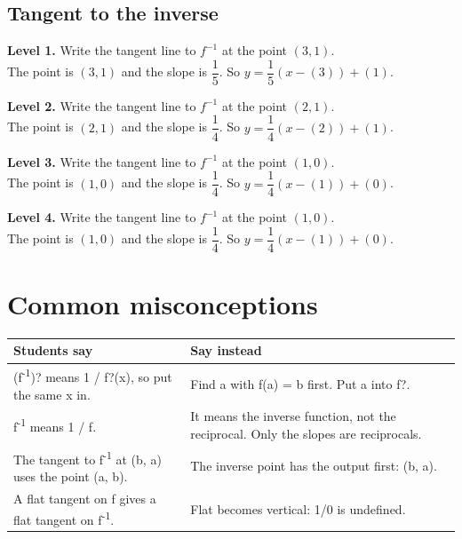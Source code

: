 \documentclass[11pt]{article}
\begin{document}
\subsection*{Tangent to the inverse}
\noindent\textbf{Level 1.} Write the tangent line to $f^{-1}$ at the point $(3,1)$.\\  \quad The point is $(3,1)$ and the slope is $\dfrac1{5}$. So $y=\dfrac1{5}(x-(3))+(1)$.\par\medskip
\noindent\textbf{Level 2.} Write the tangent line to $f^{-1}$ at the point $(2,1)$.\\  \quad The point is $(2,1)$ and the slope is $\dfrac1{4}$. So $y=\dfrac1{4}(x-(2))+(1)$.\par\medskip
\noindent\textbf{Level 3.} Write the tangent line to $f^{-1}$ at the point $(1,0)$.\\  \quad The point is $(1,0)$ and the slope is $\dfrac1{4}$. So $y=\dfrac1{4}(x-(1))+(0)$.\par\medskip
\noindent\textbf{Level 4.} Write the tangent line to $f^{-1}$ at the point $(1,0)$.\\  \quad The point is $(1,0)$ and the slope is $\dfrac1{4}$. So $y=\dfrac1{4}(x-(1))+(0)$.\par\medskip
\section*{Common misconceptions}\begin{tabularx}{\textwidth}{@{}X X@{}}\toprule Students say & Say instead\\\midrule
(f\textsuperscript{-1})? means 1 / f?(x), so put the same x in. & Find a with f(a) = b first. Put a into f?.\\
f\textsuperscript{-1} means 1 / f. & It means the inverse function, not the reciprocal. Only the slopes are reciprocals.\\
The tangent to f\textsuperscript{-1} at (b, a) uses the point (a, b). & The inverse point has the output first: (b, a).\\
A flat tangent on f gives a flat tangent on f\textsuperscript{-1}. & Flat becomes vertical: 1/0 is undefined.\\
\bottomrule\end{tabularx}
\end{document}

